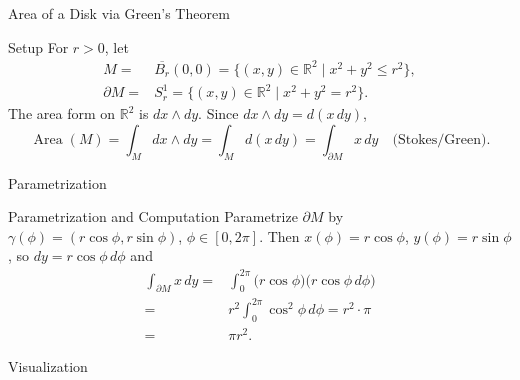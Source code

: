 
\date{31 October 2025}



\begin{frame}
  \cmctitleframe
\end{frame}


\begin{frame}{Area of a Disk via Green’s Theorem}
\begin{block}{Setup}
For $r>0$, let
\begin{align*}
M=&\overline{B_r}(0,0)=\{(x,y)\in\mathbb{R}^2\mid x^2+y^2\le r^2\},\\
\partial M=&S_r^1=\{(x,y)\in\mathbb{R}^2\mid x^2+y^2=r^2\}.
\end{align*}
The area form on $\mathbb{R}^2$ is $dx\wedge dy$. Since $dx\wedge dy=d(x\,dy)$,
\[
\operatorname{Area}(M)=\int_{M} dx\wedge dy=\int_{M} d(x\,dy)=\int_{\partial M} x\,dy
\quad\text{(Stokes/Green)}.
\]
\end{block}


\end{frame}

\begin{frame}{Parametrization}
\begin{block}{Parametrization and Computation}
Parametrize $\partial M$ by $\gamma(\phi)=(r\cos\phi,r\sin\phi)$, $\phi\in[0,2\pi]$.
Then $x(\phi)=r\cos\phi$, $y(\phi)=r\sin\phi$, so $dy=r\cos\phi\,d\phi$ and
\begin{align*}
\int_{\partial M} x\,dy=&\int_{0}^{2\pi} \bigl(r\cos\phi\bigr)\bigl(r\cos\phi\,d\phi\bigr)\\
=&r^2\int_{0}^{2\pi}\cos^2\phi\,d\phi=r^2\cdot\pi\\=&\pi r^2.
\end{align*}
\end{block}
\end{frame}

\begin{frame}{Visualization}
    \begin{center}
\end{center}
\end{frame}

